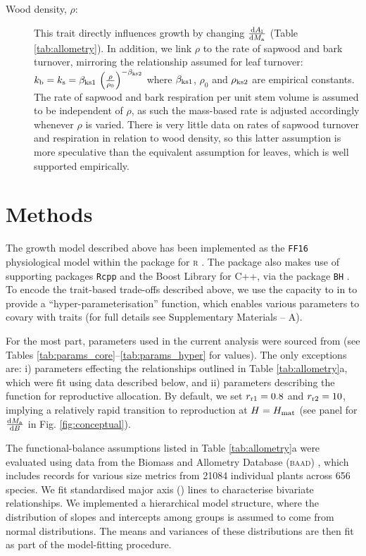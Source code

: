 \documentclass[a4paper,11pt]{article}
\begin{document}
\begin{description}
\item[Wood density, $\rho$:] This trait directly influences growth by changing $\frac{{\rm d}A_{\rm l}}{{\rm d}M_{\rm a}}$ (Table \ref{tab:allometry}). In addition, we link $\rho$ to the rate of sapwood and bark turnover, mirroring the relationship assumed for leaf turnover: $k_{\rm b} = k_{\rm s} = \beta_{{\rm ks1}} \, \left(\frac{\rho}{\rho_0}\right)^{-\beta_{{\rm ks2}}}$ where $\beta_{{\rm ks1}}$, $\rho_0$ and $\rho_{{\rm ks2}}$ are empirical constants. The rate of sapwood and bark respiration per unit stem volume is assumed to be independent of $\rho$, as such the mass-based rate is adjusted accordingly whenever $\rho$ is varied. There is very little data on rates of sapwood turnover and respiration in relation to wood density, so this latter assumption is more speculative than the equivalent assumption for leaves, which is well supported empirically.
 \end{description}

\section{Methods}

The growth model described above has been implemented as the \texttt{FF16} physiological model within the {\plant} package \citep{Falster-2016} for \textsc{r} \citep{R-2015}. The {\plant} package also makes use of supporting packages \texttt{Rcpp} \citep{Eddelbuettel-2013} and the Boost Library for C++\citep{Schaling-2014}, via the package \texttt{BH} \citep{Eddelbuettel-2015}. To encode the trait-based trade-offs described above, we use the capacity to in {\plant} to provide a ``hyper-parameterisation'' function, which enables various parameters to covary with traits (for full details see Supplementary Materials -- A).

For the most part, parameters used in the current analysis were sourced from \citet{Falster-2016} (see Tables \ref{tab:params_core}--\ref{tab:params_hyper} for values). The only exceptions are: i) parameters effecting the relationships outlined in Table \ref{tab:allometry}a, which were fit using data described below, and ii) parameters describing the function for reproductive allocation. By default, we set $r_{\rm r1}=0.8$ and $r_{\rm r2}=10$, implying a relatively rapid transition to reproduction at $H=H_{{\rm mat}}$ (see panel for $\frac{{\rm d}M_{{\rm a}}}{{\rm d}B}$ in Fig. \ref{fig:conceptual}).

The functional-balance assumptions listed in Table \ref{tab:allometry}a were evaluated using data from the Biomass and Allometry Database (\textsc{baad}) \citep{Falster-2015b}, which includes records for various size metrics from 21084 individual plants across 656 species. We fit standardised major axis ({\sma}) lines \citep{Warton-2006} to characterise bivariate relationships. We implemented a hierarchical model structure, where the distribution of slopes and intercepts among groups is assumed to come from normal distributions. The means and variances of these distributions are then fit as part of the model-fitting procedure.
\end{document}
